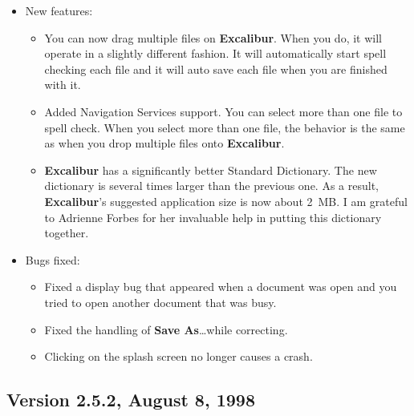 \documentclass[11pt,titlepage]{article}
\newcommand{\ex}{\textbf{Excalibur}}
\begin{document}
\begin{itemize}
\item New features:

  \begin{itemize}
  \item You can now drag multiple files on \ex.  When you do, it will
    operate in a slightly different fashion.  It will automatically
    start spell checking each file and it will auto save each file
    when you are finished with it.

  \item Added Navigation Services support.  You can select more than
    one file to spell check.  When you select more than one file, the
    behavior is the same as when you drop multiple files onto \ex.

  \item \ex{} has a significantly better Standard Dictionary.  The new
    dictionary is several times larger than the previous one.  As a
    result, \ex's suggested application size is now about 2~MB.  I am
    grateful to Adrienne Forbes for her invaluable help in putting
    this dictionary together.

  \end{itemize}

\item Bugs fixed:

  \begin{itemize}
  \item Fixed a display bug that appeared when a document was open and
    you tried to open another document that was busy.

  \item Fixed the handling of \textbf{Save As}\ldots while correcting.

  \item Clicking on the splash screen no longer causes a crash.
  \end{itemize}

\end{itemize}

\subsection{Version 2.5.2, August 8, 1998}
\end{document}
